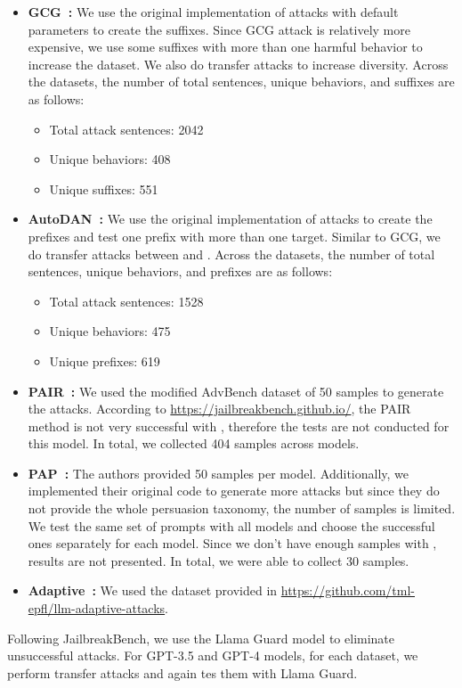 \begin{itemize}
    \item \textbf{GCG~\citep{zou2023universal}:} We use the original implementation of attacks with default parameters to create the suffixes. Since GCG attack is relatively more expensive, we use some suffixes with more than one harmful behavior to increase the dataset. We also do transfer attacks to increase diversity. Across the datasets, the number of total sentences, unique behaviors, and suffixes are as follows:
    \begin{itemize}
        \item Total attack sentences: 2042
        \item Unique behaviors: 408
        \item Unique suffixes: 551
    \end{itemize}
    \item \textbf{AutoDAN~\citep{liu2023autodan}:} We use the original implementation of attacks to create the prefixes and test one prefix with more than one target. Similar to GCG, we do transfer attacks between \vicuna{} and \llama{}. Across the datasets, the number of total sentences, unique behaviors, and prefixes are as follows:
    \begin{itemize}
        \item Total attack sentences: 1528
        \item Unique behaviors: 475
        \item Unique prefixes: 619
    \end{itemize}
    \item \textbf{PAIR~\citep{chao2023jailbreaking}:} We used the modified AdvBench dataset of 50 samples to generate the attacks. According to \url{https://jailbreakbench.github.io/}, the PAIR method is not very successful with \llama{}, therefore the tests are not conducted for this model. In total, we collected 404 samples across models.
    \item \textbf{PAP~\citep{zeng2024johnny}:} The authors provided 50 samples per model. Additionally, we implemented their original code to generate more attacks but since they do not provide the whole persuasion taxonomy, the number of samples is limited. We test the same set of prompts with all models and choose the successful ones separately for each model. Since we don't have enough samples with \llama{}, results are not presented. In total, we were able to collect 30 samples.
    \item \textbf{Adaptive~\citep{andriushchenko2024jailbreaking}:} We used the dataset provided in \url{https://github.com/tml-epfl/llm-adaptive-attacks}.
\end{itemize}
Following JailbreakBench, we use the Llama Guard model to eliminate unsuccessful attacks. For GPT-3.5 and GPT-4 models, for each dataset, we perform transfer attacks and again tes them with Llama Guard.

